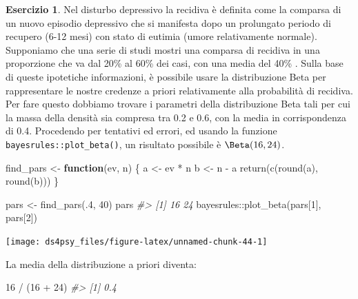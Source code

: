 \documentclass[
  11pt,
]{krantz}
\makeatletter
\newenvironment{Shaded}{\begin{snugshade}}{\end{snugshade}}
\newcommand{\CommentTok}[1]{\textcolor[rgb]{0.37,0.37,0.37}{\textit{#1}}}
\newcommand{\ControlFlowTok}[1]{\textcolor[rgb]{0.27,0.27,0.27}{\textbf{#1}}}
\newcommand{\DecValTok}[1]{\textcolor[rgb]{0.06,0.06,0.06}{#1}}
\newcommand{\FunctionTok}[1]{\textcolor[rgb]{0,0,0}{#1}}
\newcommand{\NormalTok}[1]{#1}
\newcommand{\OtherTok}[1]{\textcolor[rgb]{0.37,0.37,0.37}{#1}}
\newcommand{\SpecialCharTok}[1]{\textcolor[rgb]{0,0,0}{#1}}
\newenvironment{kframe}{%
\medskip{}
\setlength{\fboxsep}{.8em}
 \def\at@end@of@kframe{}%
 \ifinner\ifhmode%
  \def\at@end@of@kframe{\end{minipage}}%
  \begin{minipage}{\columnwidth}%
 \fi\fi%
 \def\FrameCommand##1{\hskip\@totalleftmargin \hskip-\fboxsep
 \colorbox{shadecolor}{##1}\hskip-\fboxsep
     \hskip-\linewidth \hskip-\@totalleftmargin \hskip\columnwidth}%
 \MakeFramed {\advance\hsize-\width
   \@totalleftmargin\z@ \linewidth\hsize
   \@setminipage}}%
 {\par\unskip\endMakeFramed%
 \at@end@of@kframe}
\renewenvironment{Shaded}{\begin{kframe}}{\end{kframe}}
\theoremstyle{definition}
\theoremstyle{definition}
\theoremstyle{definition}
\newtheorem{exercise}{Esercizio}[chapter]
\theoremstyle{definition}
\theoremstyle{remark}
\makeatother
\begin{document}
\begin{exercise}
Nel disturbo depressivo la recidiva è definita come la comparsa di un nuovo episodio depressivo che si manifesta dopo un prolungato periodo di recupero (6-12 mesi) con stato di eutimia (umore relativamente normale). Supponiamo che una serie di studi mostri una comparsa di recidiva in una proporzione che va dal 20\% al 60\% dei casi, con una media del 40\% \citep[per una recente discussione, si veda][]{nuggerud2020analysis}. Sulla base di queste ipotetiche informazioni, è possibile usare la distribuzione Beta per rappresentare le nostre credenze a priori relativamente alla probabilità di recidiva. Per fare questo dobbiamo trovare i parametri della distribuzione Beta tali per cui la massa della densità sia compresa tra 0.2 e 0.6, con la media in corrispondenza di 0.4. Procedendo per tentativi ed errori, ed usando la funzione \texttt{bayesrules::plot\_beta()}, un risultato possibile è \(\Beta(16, 24)\).

\begin{Shaded}
\begin{Highlighting}[]
\NormalTok{find\_pars }\OtherTok{\textless{}{-}} \ControlFlowTok{function}\NormalTok{(ev, n) \{}
\NormalTok{  a }\OtherTok{\textless{}{-}}\NormalTok{ ev }\SpecialCharTok{*}\NormalTok{ n}
\NormalTok{  b }\OtherTok{\textless{}{-}}\NormalTok{ n }\SpecialCharTok{{-}}\NormalTok{ a}
  \FunctionTok{return}\NormalTok{(}\FunctionTok{c}\NormalTok{(}\FunctionTok{round}\NormalTok{(a), }\FunctionTok{round}\NormalTok{(b)))}
\NormalTok{\}}

\NormalTok{pars }\OtherTok{\textless{}{-}} \FunctionTok{find\_pars}\NormalTok{(.}\DecValTok{4}\NormalTok{, }\DecValTok{40}\NormalTok{)}
\NormalTok{pars}
\CommentTok{\#\textgreater{} [1] 16 24}
\NormalTok{bayesrules}\SpecialCharTok{::}\FunctionTok{plot\_beta}\NormalTok{(pars[}\DecValTok{1}\NormalTok{], pars[}\DecValTok{2}\NormalTok{])}
\end{Highlighting}
\end{Shaded}

\begin{center}\texttt{[image: ds4psy\_files/figure-latex/unnamed-chunk-44-1]} \end{center}

La media della distribuzione a priori diventa:

\begin{Shaded}
\begin{Highlighting}[]
\DecValTok{16} \SpecialCharTok{/}\NormalTok{ (}\DecValTok{16} \SpecialCharTok{+} \DecValTok{24}\NormalTok{)}
\CommentTok{\#\textgreater{} [1] 0.4}
\end{Highlighting}
\end{Shaded}


\end{exercise}
\end{document}

